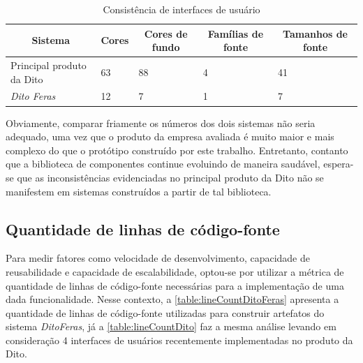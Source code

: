 \begin{table}
  \centering
  \begin{tabular}{|m{3cm}|m{1cm}|m{1cm}|m{1cm}|m{1cm}|} \hline
    
    \multicolumn{1}{|c|}{\bfseries Sistema} & \multicolumn{1}{c|}{\bfseries Cores} & \multicolumn{1}{c|}{\bfseries Cores de fundo} & \multicolumn{1}{c|}{\bfseries Famílias de fonte} & \multicolumn{1}{c|}{\bfseries Tamanhos de fonte} \\\hline
    
    Principal produto da Dito & 63 & 88 & 4 & 41 \\\hline
    \textit{Dito Feras} & 12 & 7 & 1 & 7 \\\hline
      
  \end{tabular}
  \caption{Consistência de interfaces de usuário}
  \label{table:interfaceConsistence}
\end{table}

Obviamente, comparar friamente os números dos dois sistemas não seria adequado, uma vez que o produto da empresa avaliada é muito maior e mais complexo do que o protótipo construído por este trabalho. Entretanto, contanto que a biblioteca de componentes continue evoluindo de maneira saudável, espera-se que as inconsistências evidenciadas no principal produto da Dito não se manifestem em sistemas construídos a partir de tal biblioteca.

\subsection{Quantidade de linhas de código-fonte}

Para medir fatores como velocidade de desenvolvimento, capacidade de reusabilidade e capacidade de escalabilidade, optou-se por utilizar a métrica de quantidade de linhas de código-fonte necessárias para a implementação de uma dada funcionalidade. Nesse contexto, a \autoref{table:lineCountDitoFeras} apresenta a quantidade de linhas de código-fonte utilizadas para construir artefatos do sistema \textit{DitoFeras}, já a \autoref{table:lineCountDito} faz a mesma análise levando em consideração 4 interfaces de usuários recentemente implementadas no produto da Dito.

